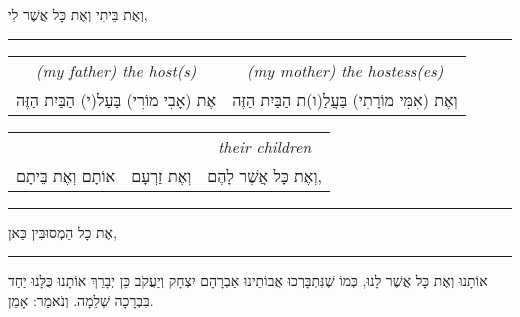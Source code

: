 \begin{center}
וְאֶת בֵּיתִי וְאֶת כָּל אֲשֶׁר לִי,

\vspace{0.1em}
\hrule
\vspace{0.1em}


\begin{tabular}{c c}
\textenglish{\itshape (my father) the host(s)}
	& \textenglish{\itshape (my mother) the hostess(es)}\\

אֶת (אָבִי מוֹרִי) בַּעַל(י) הַבַּיִת הַזֶּה & וְאֶת (אִמִּי מוֹרָתִי) בַּעֲלַ(ו)ת הַבַּיִת הַזֶּה \\
\end{tabular}

\begin{tabular}{c c c}
	&	& \textenglish{\itshape their children} \\
אוֹתָם וְאֶת בֵּיתָם & וְאֶת זַרְעָם & וְאֶת כָּל אֲשֶׁר לָהֶם, \\
\end{tabular}

\vspace{0.1em}
\hrule
\vspace{0.1em}


אֶת כָל הַמְסוּבִּין כַּאן,

\vspace{0.1em}
\hrule
\vspace{0.1em}


אוֹתָנוּ וְאֶת כָּל אֲשֶׁר לָנוּ, כְּמוֹ שֶׁנִּתְבָּרְכוּ אֲבוֹתֵינוּ אַבְרָהָם יִצְחָק וְיַעֲקֹב
כֵּן יְבָרֵךְ אוֹתָנוּ כֻּלָּנוּ יַחַד בִּבְרָכָה שְׁלֵמָה. וְנֹאמַר: אָמֵן.

\end{center}

